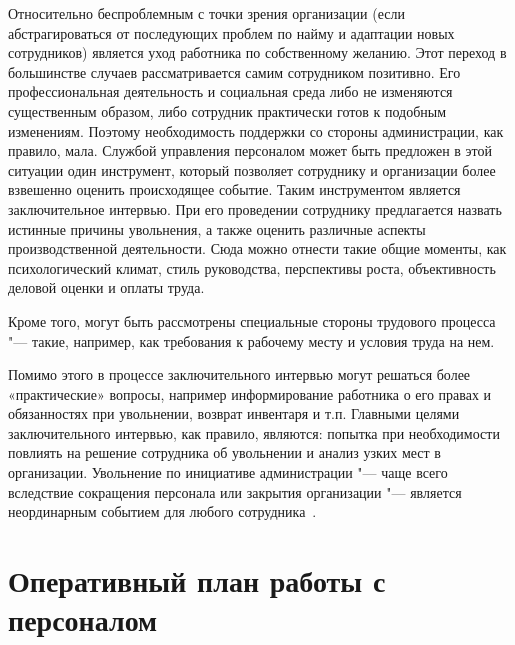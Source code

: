 \documentclass{../industrial-development}
\begin{document}
Относительно беспроблемным с точки зрения организации (если абстрагироваться от последующих проблем по найму и адаптации новых сотрудников) является уход работника по собственному желанию. Этот переход в большинстве случаев рассматривается самим сотрудником позитивно. Его профессиональная деятельность и социальная среда либо не изменяются существенным образом, либо сотрудник практически готов к подобным изменениям. Поэтому необходимость поддержки со стороны администрации, как правило, мала. Службой управления персоналом может быть предложен в этой ситуации один инструмент, который позволяет сотруднику и организации более взвешенно оценить происходящее событие. Таким инструментом является заключительное интервью. При его проведении сотруднику предлагается назвать истинные причины увольнения, а также оценить различные аспекты производственной деятельности. Сюда можно отнести такие общие моменты, как психологический климат, стиль руководства, перспективы роста, объективность деловой оценки и оплаты труда.

Кроме того, могут быть рассмотрены специальные стороны трудового процесса "--- такие, например, как требования к рабочему месту и условия труда на нем.

Помимо этого в процессе заключительного интервью могут решаться более «практические» вопросы, например информирование работника о его правах и обязанностях при увольнении, возврат инвентаря и т.п. Главными целями заключительного интервью, как правило, являются: попытка при необходимости повлиять на решение сотрудника об увольнении и анализ узких мест в организации.
Увольнение по инициативе администрации "--- чаще всего вследствие сокращения персонала или закрытия организации "--- является неординарным событием для любого сотрудника~\cite[с.~383--384]{Kibanov}.


\section{Оперативный план работы с персоналом}
\end{document}
